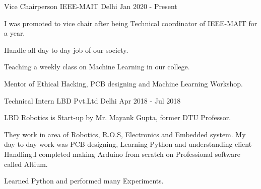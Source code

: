 \begin{cventries}
  \cventry
    {Vice Chairperson} %
    {IEEE-MAIT} %
    {Delhi} %
    { Jan 2020 - Present} %
    {
      \begin{cvitems} %
        \item {I was promoted to vice chair after being Technical coordinator of IEEE-MAIT for a year.}
        \item {Handle all day to day job of our society.}
        \item {Teaching a weekly class on Machine Learning in our college.}
        \item {Mentor of Ethical Hacking, PCB designing and Machine Learning Workshop.}
      \end{cvitems}
    }
  \cventry
    {Technical Intern}
    {LBD Pvt.Ltd}%
    {Delhi} %
    {Apr 2018 - Jul 2018} %
    {
      \begin{cvitems} %
        \item { LBD Robotics is Start-up by Mr. Mayank Gupta, former DTU Professor.}
        \item { They work in area of Robotics, R.O.S, Electronics and Embedded system. My day to day work was PCB designing, Learning Python and understanding client Handling.I completed making Arduino from scratch on Professional software called Altium.}
        \item {Learned Python and performed many Experiments.}
      \end{cvitems}
    }

\end{cventries}
